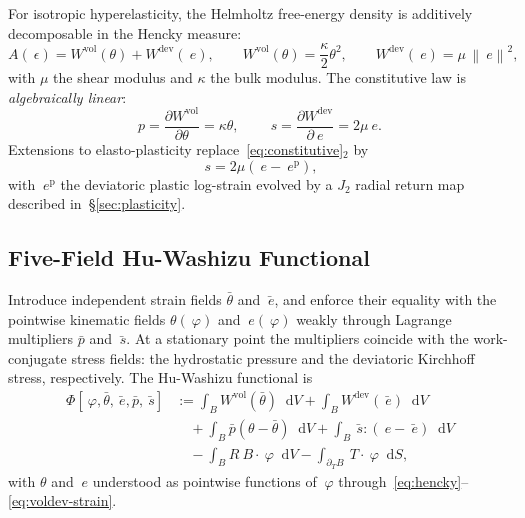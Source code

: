 \documentclass[12pt]{article}
\newcommand{\eps}{~\epsilon}
\newcommand{\edev}{~e}
\newcommand{\ebar}{\bar{~e}}
\newcommand{\sdev}{~s}
\newcommand{\sbar}{\bar{~s}}
\newcommand{\thbar}{\bar{\theta}}
\newcommand{\pbar}{\bar{p}}
\newcommand{\supvol}{^{\mathrm{vol}}}
\newcommand{\supdev}{^{\mathrm{dev}}}
\newcommand{\norm}[1]{\left\lVert {#1} \right\rVert}
\newcommand*\diff{\mathop{}\!\mathrm{d}}
\begin{document}
For isotropic hyperelasticity, the Helmholtz free-energy density is
additively decomposable in the Hencky measure:
\begin{equation}
  \label{eq:W-split}
  A(\eps) = W\supvol(\theta) + W\supdev(\edev),
  \qquad
  W\supvol(\theta) = \frac{\kappa}{2} \theta^2,
  \qquad
  W\supdev(\edev) = \mu \, \norm{\edev}^2,
\end{equation}
with $\mu$ the shear modulus and $\kappa$ the bulk modulus. The
constitutive law is \emph{algebraically linear}:
\begin{equation}
  \label{eq:constitutive}
  p = \frac{\partial W\supvol}{\partial \theta} = \kappa \theta,
  \qquad
  \sdev = \frac{\partial W\supdev}{\partial \edev} = 2\mu \edev.
\end{equation}
Extensions to elasto-plasticity replace~\eqref{eq:constitutive}$_2$ by
\begin{equation}
  \label{eq:constitutive-plastic}
  \sdev = 2\mu \left( \edev - \edev^{\mathrm{p}} \right),
\end{equation}
with $\edev^{\mathrm{p}}$ the deviatoric plastic log-strain
evolved by a $J_2$ radial return map described
in~\S\ref{sec:plasticity}.

\subsection{Five-Field Hu-Washizu Functional}
\label{sec:hw-functional}

Introduce independent strain fields $\thbar$ and $\ebar$, and
enforce their equality with the pointwise kinematic fields
$\theta(~\varphi)$ and $\edev(~\varphi)$ weakly through Lagrange
multipliers $\pbar$ and $\sbar$. At a stationary point the
multipliers coincide with the work-conjugate stress fields: the
hydrostatic pressure and the deviatoric Kirchhoff stress,
respectively. The Hu-Washizu functional is
\begin{equation}
  \label{eq:hw}
  \begin{split}
    \Phi[~\varphi, \thbar, \ebar, \pbar, \sbar] & :=
    \int_B W\supvol(\thbar) \diff V
    +
    \int_B W\supdev(\ebar) \diff V
    \\
    & \quad
    +
    \int_B \pbar \left( \theta - \thbar \right) \diff V
    +
    \int_B \sbar : \left( \edev - \ebar \right) \diff V
    \\
    & \quad
    -
    \int_B R ~B \cdot ~\varphi \diff V
    -
    \int_{\partial_T B} ~T \cdot ~\varphi \diff S,
  \end{split}
\end{equation}
with $\theta$ and $\edev$ understood as pointwise functions
of $~\varphi$ through~\eqref{eq:hencky}--\eqref{eq:voldev-strain}.
\end{document}
